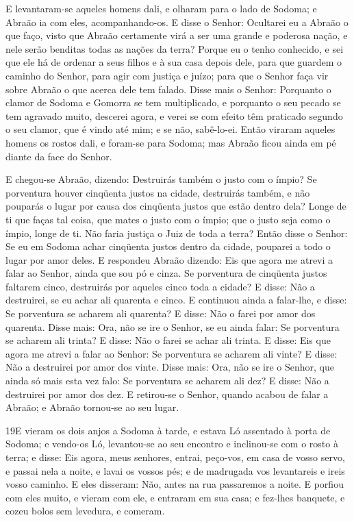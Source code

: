 E levantaram-se aqueles homens dali, e olharam para o lado de
Sodoma; e Abraão ia com eles, acompanhando-os. E disse o
Senhor: Ocultarei eu a Abraão o que faço, visto que Abraão
certamente virá a ser uma grande e poderosa nação, e nele serão
benditas todas as nações da terra? Porque eu o tenho
conhecido, e sei que ele há de ordenar a seus filhos e à sua casa
depois dele, para que guardem o caminho do Senhor, para agir com
justiça e juízo; para que o Senhor faça vir sobre Abraão o que
acerca dele tem falado. Disse mais o Senhor: Porquanto o
clamor de Sodoma e Gomorra se tem multiplicado, e porquanto o seu
pecado se tem agravado muito, descerei agora, e verei se com
efeito têm praticado segundo o seu clamor, que é vindo até mim; e se
não, sabê-lo-ei. Então viraram aqueles homens os rostos dali,
e foram-se para Sodoma; mas Abraão ficou ainda em pé diante da face
do Senhor.

E chegou-se Abraão, dizendo: Destruirás também o justo com o
ímpio? Se porventura houver cinqüenta justos na cidade,
destruirás também, e não pouparás o lugar por causa dos cinqüenta
justos que estão dentro dela? Longe de ti que faças tal
coisa, que mates o justo com o ímpio; que o justo seja como o ímpio,
longe de ti. Não faria justiça o Juiz de toda a terra? Então
disse o Senhor: Se eu em Sodoma achar cinqüenta justos dentro da
cidade, pouparei a todo o lugar por amor deles. E respondeu
Abraão dizendo: Eis que agora me atrevi a falar ao Senhor, ainda que
sou pó e cinza. Se porventura de cinqüenta justos faltarem
cinco, destruirás por aqueles cinco toda a cidade? E disse: Não a
destruirei, se eu achar ali quarenta e cinco. E continuou
ainda a falar-lhe, e disse: Se porventura se acharem ali quarenta? E
disse: Não o farei por amor dos quarenta. Disse mais: Ora,
não se ire o Senhor, se eu ainda falar: Se porventura se acharem ali
trinta? E disse: Não o farei se achar ali trinta. E disse:
Eis que agora me atrevi a falar ao Senhor: Se porventura se acharem
ali vinte? E disse: Não a destruirei por amor dos vinte.
Disse mais: Ora, não se ire o Senhor, que ainda só mais esta
vez falo: Se porventura se acharem ali dez? E disse: Não a
destruirei por amor dos dez. E retirou-se o Senhor, quando
acabou de falar a Abraão; e Abraão tornou-se ao seu lugar.

\smallskip

\lettrine{19} E vieram os dois anjos a Sodoma à tarde, e
estava Ló assentado à porta de Sodoma; e vendo-os Ló, levantou-se ao
seu encontro e inclinou-se com o rosto à terra; e disse: Eis
agora, meus senhores, entrai, peço-vos, em casa de vosso servo, e
passai nela a noite, e lavai os vossos pés; e de madrugada vos
levantareis e ireis vosso caminho. E eles disseram: Não, antes na
rua passaremos a noite. E porfiou com eles muito, e vieram com
ele, e entraram em sua casa; e fez-lhes banquete, e cozeu bolos sem
levedura, e comeram.


